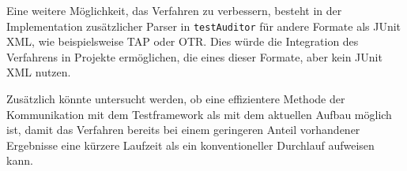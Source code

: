 Eine weitere Möglichkeit, das Verfahren zu verbessern, besteht in der Implementation zusätzlicher Parser in \texttt{testAuditor} für andere Formate als JUnit XML, wie beispielsweise TAP oder OTR. Dies würde die Integration des Verfahrens in Projekte ermöglichen, die eines dieser Formate, aber kein JUnit XML nutzen.

Zusätzlich könnte untersucht werden, ob eine effizientere Methode der Kommunikation mit dem Testframework als mit dem aktuellen Aufbau möglich ist, damit das Verfahren bereits bei einem geringeren Anteil vorhandener Ergebnisse eine kürzere Laufzeit als ein konventioneller Durchlauf aufweisen kann. 
